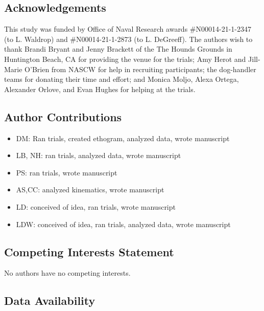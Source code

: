 \documentclass[
]{article}
\providecommand{\tightlist}{%
  \setlength{\itemsep}{0pt}\setlength{\parskip}{0pt}}
\begin{document}
\hypertarget{acknowledgements}{%
\subsection{Acknowledgements}\label{acknowledgements}}

This study was funded by Office of Naval Research awards \#N00014-21-1-2347 (to L. Waldrop) and \#N00014-21-1-2873 (to L. DeGreeff). The authors wish to thank Brandi Bryant and Jenny Brackett of the The Hounds Grounds in Huntington Beach, CA for providing the venue for the trials; Amy Herot and Jill-Marie O'Brien from NASCW for help in recruiting participants; the dog-handler teams for donating their time and effort; and Monica Moljo, Alexa Ortega, Alexander Orlove, and Evan Hughes for helping at the trials.

\hypertarget{author-contributions}{%
\subsection{Author Contributions}\label{author-contributions}}

\begin{itemize}
\tightlist
\item
  DM: Ran trials, created ethogram, analyzed data, wrote manuscript
\item
  LB, NH: ran trials, analyzed data, wrote manuscript
\item
  PS: ran trials, wrote manuscript
\item
  AS,CC: analyzed kinematics, wrote manuscript
\item
  LD: conceived of idea, ran trials, wrote manuscript
\item
  LDW: conceived of idea, ran trials, analyzed data, wrote manuscript
\end{itemize}

\hypertarget{competing-interests-statement}{%
\subsection{Competing Interests Statement}\label{competing-interests-statement}}

No authors have no competing interests.

\hypertarget{data-availability}{%
\subsection{Data Availability}\label{data-availability}}
\end{document}
